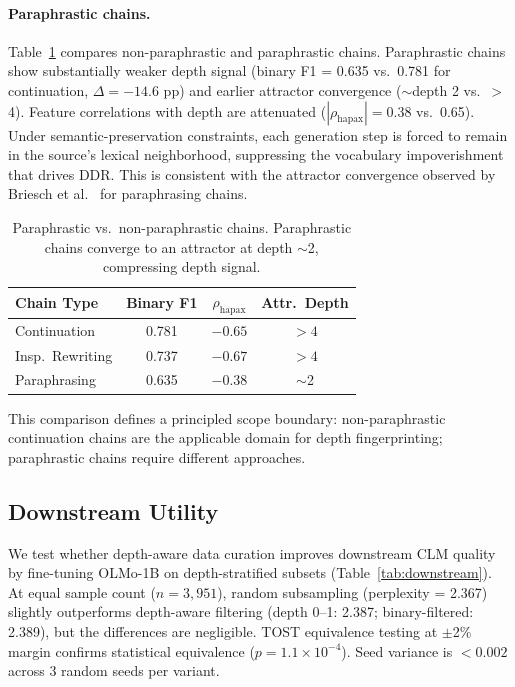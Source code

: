 \documentclass[11pt]{article}
\begin{document}
\paragraph{Paraphrastic chains.}
Table~\ref{tab:para} compares non-paraphrastic and paraphrastic chains. Paraphrastic chains show substantially weaker depth signal (binary F1 = 0.635 vs.\ 0.781 for continuation, $\Delta = -14.6$ pp) and earlier attractor convergence ($\sim$depth 2 vs.\ $>$4). Feature correlations with depth are attenuated ($|{\rho_{\mathrm{hapax}}}| = 0.38$ vs.\ 0.65). Under semantic-preservation constraints, each generation step is forced to remain in the source's lexical neighborhood, suppressing the vocabulary impoverishment that drives DDR. This is consistent with the attractor convergence observed by Briesch et al.\ \cite{briesch2025broken} for paraphrasing chains.

\begin{table}[t]
\centering
\small
\begin{tabular}{lccc}
\toprule
\textbf{Chain Type} & \textbf{Binary F1} & \textbf{$\rho_{\mathrm{hapax}}$} & \textbf{Attr.\ Depth} \\
\midrule
Continuation & 0.781 & $-0.65$ & $>4$ \\
Insp.\ Rewriting & 0.737 & $-0.67$ & $>4$ \\
Paraphrasing & 0.635 & $-0.38$ & $\sim$2 \\
\bottomrule
\end{tabular}
\caption{Paraphrastic vs.\ non-paraphrastic chains. Paraphrastic chains converge to an attractor at depth $\sim$2, compressing depth signal.}
\label{tab:para}
\end{table}

This comparison defines a principled scope boundary: non-paraphrastic continuation chains are the applicable domain for depth fingerprinting; paraphrastic chains require different approaches.

\subsection{Downstream Utility}
\label{sec:downstream}

We test whether depth-aware data curation improves downstream CLM quality by fine-tuning OLMo-1B on depth-stratified subsets (Table~\ref{tab:downstream}). At equal sample count ($n = 3{,}951$), random subsampling (perplexity = 2.367) slightly outperforms depth-aware filtering (depth 0--1: 2.387; binary-filtered: 2.389), but the differences are negligible. TOST equivalence testing at $\pm$2\% margin confirms statistical equivalence ($p = 1.1 \times 10^{-4}$). Seed variance is $< 0.002$ across 3 random seeds per variant.
\end{document}

